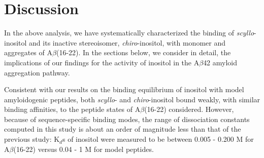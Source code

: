 





\section{Discussion} %
\label{sec:discussion}

In the above analysis, we have systematically characterized the binding of \emph{scyllo}-inositol and its inactive stereoisomer, \emph{chiro}-inositol, with monomer and aggregates of A$\beta$(16-22). In the sections below, we consider in detail, the implications of our findings for the activity of inositol in the A$\beta$42 amyloid aggregation pathway.

Consistent with our results on the binding equilibrium of inositol with model amyloidogenic peptides,\cite{Li:2012p853} both \emph{scyllo}- and \emph{chiro}-inositol bound weakly, with similar binding affinities, to the peptide states of A$\beta$(16-22) considered. However, because of sequence-specific binding modes, the range of dissociation constants computed in this study is about an order of magnitude less than that of the previous study: K$_{d}$s of inositol were measured to be between 0.005 - 0.200 M for A$\beta$(16-22) versus 0.04 - 1 M for model peptides.

